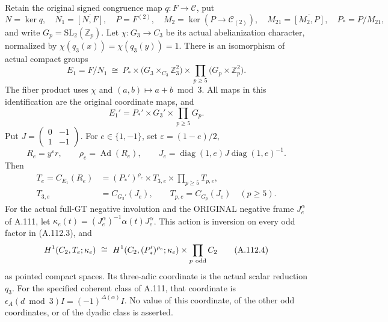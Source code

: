 Retain the original signed congruence map \(q:F\to\mathcal C\), put
\[
 N=\ker q,\quad N_1=\overline{[N,F]},\quad
 P=F^{(2)},\quad M_2=\ker(P\to\mathcal C_{(2)}),\quad
 M_{21}=\overline{[M_2,P]},\quad P_*=P/M_{21},
\]
and write \(G_p=\mathrm{SL}_2(\mathbb Z_p)\).
Let \(\chi:G_3\to C_3\) be its actual abelianization character,
normalized by \(\chi(q_3(x))=\chi(q_3(y))=1\).
There is an isomorphism of actual compact groups
\[
 E_1=F/N_1\ \cong\
 P_*\times\bigl(G_3\times_{C_3}\mathbb Z_3^2\bigr)
       \times\prod_{p\geq5}\bigl(G_p\times\mathbb Z_p^2\bigr).
 \tag{A.112.1}
\]
The fiber product uses \(\chi\) and \((a,b)\mapsto a+b\bmod3\).
All maps in this identification are the original coordinate maps, and
\[
 E_1'=P_*'\times G_3'\times\prod_{p\geq5}G_p.
 \tag{A.112.2}
\]
Put \(J=\left(\begin{smallmatrix}0&-1\\1&-1\end{smallmatrix}\right)\).
For \(e\in\{1,-1\}\), set \(\varepsilon=(1-e)/2\),
\[
 R_e=y^\varepsilon r,\qquad \rho_e=\operatorname{Ad}(R_e),\qquad
 J_e=\operatorname{diag}(1,e)J\operatorname{diag}(1,e)^{-1}.
\]
Then
\[
 \begin{split}
 T_e=C_{E_1}(R_e)
   &=(P_*')^{\rho_e}\times T_{3,e}\times\prod_{p\geq5}T_{p,e},\\
 T_{3,e}&=C_{G_3'}(J_e),\qquad T_{p,e}=C_{G_p}(J_e)\quad(p\geq5).
 \end{split}
 \tag{A.112.3}
\]
For the actual full-GT negative involution and the ORIGINAL negative
frame \(J_e^\alpha\) of A.111, let
\(\kappa_e(t)=(J_e^\alpha)^{-1}\alpha(t)J_e^\alpha\).
This action is inversion on every odd factor in (A.112.3), and
\[
 H^1(C_2,T_e;\kappa_e)\ \cong\
 H^1(C_2,(P_*')^{\rho_e};\kappa_e)\times
                  \prod_{p\ {\rm odd}}C_2
 \tag{A.112.4}
\]
as pointed compact spaces. Its three-adic coordinate is the actual
scalar reduction \(q_3\). For the specified coherent class of A.111,
that coordinate is
\(\epsilon_A(d\bmod3)I=(-1)^{\Delta(\alpha)}I\).
No value of this coordinate, of the other odd coordinates, or of the
dyadic class is asserted.

